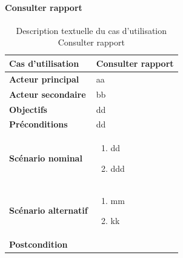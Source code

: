         \paragraph[Consulter rapport]{Consulter rapport}
        \begin{longtable}{p{4cm} p{9cm}}
            \caption{Description textuelle du cas d’utilisation Consulter rapport}
            \label{table:usecaseConsulterRapport}
            \\\hline\hline
                \textbf{Cas d’utilisation} & \textbf{Consulter rapport}
            \\\hline\hline
                    \textbf{Acteur principal} & aa
                \\
                    \textbf{Acteur secondaire} & bb
                \\
                    \textbf{Objectifs} & dd
                \\
                    \textbf{Préconditions} & dd
                \\
                \textbf{Scénario nominal} &
                    \begin{enumerate}[leftmargin=*]
                        \item dd
                        \item ddd
                    \end{enumerate}
                \\
                \textbf{Scénario alternatif} &
                    \begin{enumerate}[leftmargin=*]
                        \item mm
                        \item kk
                    \end{enumerate}
                \\
                \textbf{Postcondition}
            \\\bottomrule
        \end{longtable}